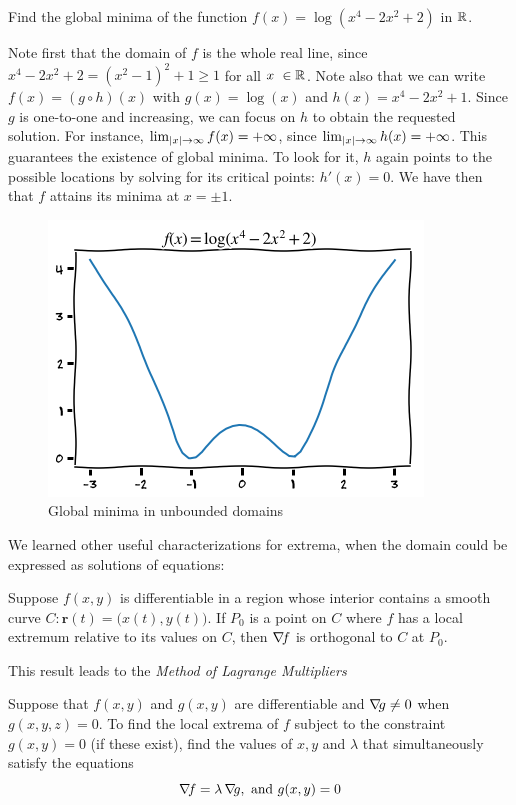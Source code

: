 \begin{example}
Find the global minima of the function $f(x)= \log (x^4-2x^2+2)$ in $\mathbb{R}$.  

Note first that the domain of $f$ is the whole real line, since $x^4-2x^2+2 = (x^2-1)^2+1 \geq 1$ for all $x\ \in \mathbb{R}$.  Note also that we can write $f(x) = (g \circ h)(x)$ with $g(x) = \log(x)$ and $h(x)=x^4-2x^2+1$.  Since $g$ is one-to-one and increasing, we can focus on $h$ to obtain the requested solution.  For instance, $\lim_{\lvert x \rvert\to\infty}f(x) = +\infty$, since $\lim_{\lvert x \rvert\to\infty} h(x) = +\infty$. This guarantees the existence of global minima.  To look for it, $h$ again points to the possible locations by solving for its critical points: $h'(x)=0$.  We have then that $f$ attains its minima at $x=\pm 1$.
\begin{figure}[ht!]
\begin{center}
\includegraphics[width=0.5\linewidth]{coercivelog.png}
\end{center}
\caption{Global minima in unbounded domains}
\label{figure:coercivelog}
\end{figure}
\end{example}

We learned other useful characterizations for extrema, when the domain could be expressed as solutions of equations:

\begin{theorem}\label{theorem:OrthogonalGradient}
Suppose $f(x,y)$ is differentiable in a region whose interior contains a smooth curve $C\colon \boldsymbol{r}(t) = \big( x(t), y(t) \big)$.  If $P_0$ is a point on $C$ where $f$ has a local extremum relative to its values on $C$, then $\mathop{\nabla\! {f}}$ is orthogonal to $C$ at $P_0$.
\end{theorem}

This result leads to the \emph{Method of Lagrange Multipliers}

\begin{theorem}\label{theorem:LM1C}
Suppose that $f(x,y)$ and $g(x,y)$ are differentiable and $\mathop{\nabla\! {g}} \neq 0$ when $g(x,y,z)=0$.  To find the local extrema of $f$ subject to the constraint $g(x,y)=0$ (if these exist), find the values of $x,y$ and $\lambda$ that simultaneously satisfy the equations
\begin{equation*}
\mathop{\nabla\! {f}} = \lambda \mathop{\nabla\! {g}}, \text{ and }g(x,y)=0
\end{equation*}
\end{theorem}

